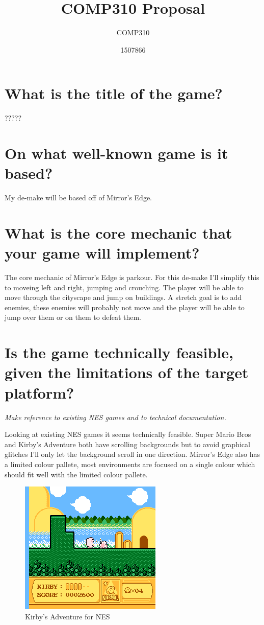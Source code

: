 \documentclass{scrartcl}
\title{COMP310 Proposal}
\subtitle{COMP310}
\author{1507866}
\begin{document}
	
\maketitle
\section{What is the title of the game?}
?????
\section{On what well-known game is it based?}
My de-make will be based off of Mirror's Edge. 

\section{What is the core mechanic that your game will implement?}
The core mechanic of Mirror's Edge is parkour. For this de-make I'll simplify this to moveing left and right, jumping and crouching. The player will be able to move through the cityscape and jump on buildings. 
A stretch goal is to add enemies, these enemies will probably not move and the player will be able to jump over them or on them to defeat them. 

\section{Is the game technically feasible, given the limitations of the target platform?} \textit{Make reference to existing NES games and to technical documentation.}

Looking at existing NES games it seems technically feasible. Super Mario Bros and Kirby's Adventure both have scrolling backgrounds but to avoid graphical glitches I'll only let the background scroll in one direction.
Mirror's Edge also has a limited colour pallete, most environments are focused on a single colour which should fit well with the limited colour pallete.

\begin{figure}[]
	\includegraphics[width=0.5\linewidth]{Kirby.PNG}
	\caption{Kirby's Adventure for NES }
\end{figure}
\end{document}

